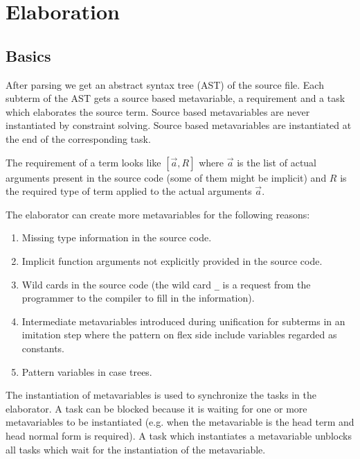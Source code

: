 \section{Elaboration}







\subsection{Basics}

After parsing we get an abstract syntax tree (AST) of the source file. Each
subterm of the AST gets a source based metavariable, a requirement and a task
which elaborates the source term. Source based metavariables are never
instantiated by constraint solving. Source based metavariables are instantiated
at the end of the corresponding task.

The requirement of a term looks like $[\vec a, R]$ where $\vec a$ is the list of
actual arguments present in the source code (some of them might be implicit) and
$R$ is the required type of term applied to the actual arguments $\vec a$.

The elaborator can create more metavariables for the following reasons:

\begin{enumerate}
    \item Missing type information in the source code.

    \item Implicit function arguments not explicitly provided in the source code.

    \item Wild cards in the source code (the wild card {\tt \_} is a request
        from the programmer to the compiler to fill in the information).

    \item Intermediate metavariables introduced during unification for subterms
        in an imitation step where the pattern on flex side include variables
        regarded as constants.

    \item Pattern variables in case trees.
\end{enumerate}

The instantiation of metavariables is used to synchronize the tasks in the
elaborator. A task can be blocked because it is waiting for one or more
metavariables to be instantiated (e.g. when the metavariable is the head term
and head normal form is required). A task which instantiates a metavariable
unblocks all tasks which wait for the instantiation of the metavariable.

